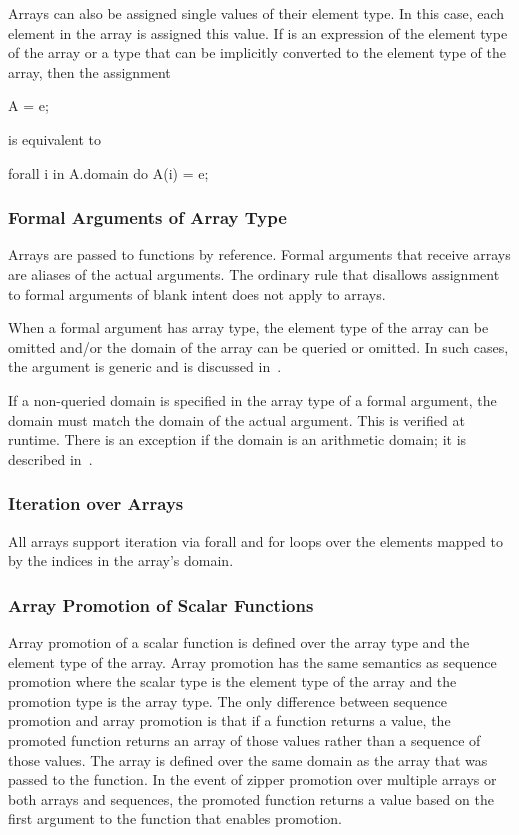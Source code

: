 Arrays can also be assigned single values of their element type.  In
this case, each element in the array is assigned this value.
If  is an expression of the element type of the array or a
type that can be implicitly converted to the element type of the
array, then the assignment
\begin{chapel}
A = e;
\end{chapel}
is equivalent to
\begin{chapel}
forall i in A.domain do
  A(i) = e;
\end{chapel}

\subsubsection{Formal Arguments of Array Type}
\label{Formal_Arguments_of_Array_Type}

Arrays are passed to functions by reference.  Formal arguments that
receive arrays are aliases of the actual arguments.  The ordinary rule
that disallows assignment to formal arguments of blank intent does not
apply to arrays.

When a formal argument has array type, the element type of the array
can be omitted and/or the domain of the array can be queried or
omitted.  In such cases, the argument is generic and is discussed
in~.

If a non-queried domain is specified in the array type of a formal
argument, the domain must match the domain of the actual argument.
This is verified at runtime.  There is an exception if the domain is
an arithmetic domain; it is described
in~.

\subsubsection{Iteration over Arrays}
\label{Iteration_over_Arrays}

All arrays support iteration via forall and for loops over the
elements mapped to by the indices in the array's domain.

\subsubsection{Array Promotion of Scalar Functions}
\label{Array_Promotion_of_Scalar_Functions}

Array promotion of a scalar function is defined over the array type
and the element type of the array.  Array promotion has the same
semantics as sequence promotion where the scalar type is the element
type of the array and the promotion type is the array type.  The only
difference between sequence promotion and array promotion is that if a
function returns a value, the promoted function returns an array of
those values rather than a sequence of those values.  The array is
defined over the same domain as the array that was passed to the
function.  In the event of zipper promotion over multiple arrays or
both arrays and sequences, the promoted function returns a value based
on the first argument to the function that enables promotion.

